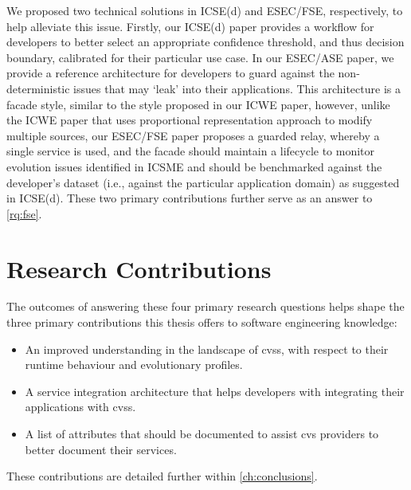 We proposed two technical solutions in ICSE(d) and ESEC/FSE, respectively, to help alleviate this issue.  Firstly, our ICSE(d) paper provides a workflow for developers to better select an appropriate confidence threshold, and thus decision boundary, calibrated for their particular use case. In our ESEC/ASE paper, we provide a reference architecture for developers to guard against the non-deterministic issues that may `leak' into their applications. This architecture is a facade style, similar to the style proposed in our ICWE paper, however, unlike the ICWE paper that uses proportional representation approach to modify multiple sources, our ESEC/FSE paper proposes a guarded relay, whereby a single service is used, and the facade should maintain a lifecycle to monitor evolution issues identified in ICSME and should be benchmarked against the developer's dataset (i.e., against the particular application domain) as suggested in ICSE(d). These two primary contributions further serve as an answer to \ref{rq:fse}.


\section{Research Contributions}



The outcomes of answering these four primary research questions helps shape the three primary contributions this thesis offers to software engineering knowledge:

\begin{itemize}
  \item An improved understanding in the landscape of \glspl{cvs}, with respect to their runtime behaviour and evolutionary profiles.
  \item A service integration architecture that helps developers with integrating their applications with \glspl{cvs}.
  \item A list of attributes that should be documented to assist \gls{cvs} providers to better document their services.
\end{itemize}

\noindent
These contributions are detailed further within \cref{ch:conclusions}.
